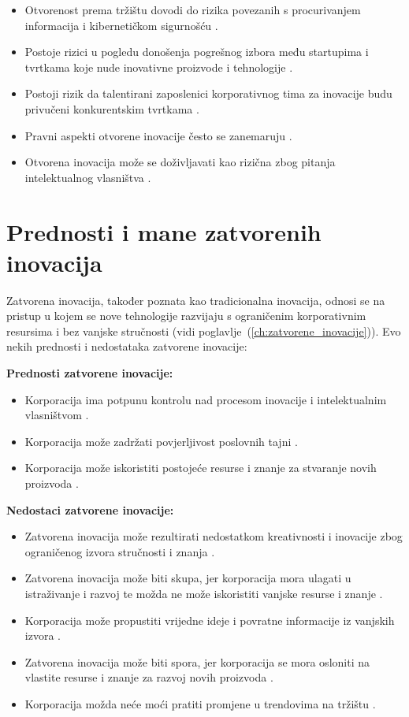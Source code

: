 \begin{itemize}
\item Otvorenost prema tržištu dovodi do rizika povezanih s procurivanjem
informacija i kibernetičkom sigurnošću \citep{gotechinnovationcompare2021}.
\item Postoje rizici u pogledu donošenja pogrešnog izbora među startupima i
tvrtkama koje nude inovativne proizvode i tehnologije \citep{gotechinnovationcompare2021}.
\item Postoji rizik da talentirani zaposlenici korporativnog tima za inovacije
budu privučeni konkurentskim tvrtkama \citep{gotechinnovationcompare2021}.
\item Pravni aspekti otvorene inovacije često se zanemaruju \citep{timercompare2016}.
\item Otvorena inovacija može se doživljavati kao rizična zbog pitanja
intelektualnog vlasništva \citep{a2dopeninnovation2023}.
\end{itemize}

\section{Prednosti i mane zatvorenih inovacija} \label{sec:prednosti_i_mane_zatvorenih_inovacija}

Zatvorena inovacija, također poznata kao tradicionalna inovacija, odnosi se na
pristup u kojem se nove tehnologije razvijaju s ograničenim korporativnim
resursima i bez vanjske stručnosti (vidi
poglavlje~(\ref{ch:zatvorene_inovacije})). Evo nekih prednosti i nedostataka
zatvorene inovacije:

\textbf{Prednosti zatvorene inovacije:}

\begin{itemize}
\item Korporacija ima potpunu kontrolu nad procesom inovacije i intelektualnim
vlasništvom \citep{asd1}.
\item Korporacija može zadržati povjerljivost poslovnih tajni \citep{asd1}.
\item Korporacija može iskoristiti postojeće resurse i znanje za stvaranje novih
proizvoda \citep{asd2}.
\end{itemize}

\textbf{Nedostaci zatvorene inovacije:}

\begin{itemize}
\item Zatvorena inovacija može rezultirati nedostatkom kreativnosti i inovacije
zbog ograničenog izvora stručnosti i znanja \citep{asd1}.
\item Zatvorena inovacija može biti skupa, jer korporacija mora ulagati u
istraživanje i razvoj te možda ne može iskoristiti vanjske resurse i znanje \citep{asd1}.
\item Korporacija može propustiti vrijedne ideje i povratne informacije iz
vanjskih izvora \citep{asd1}.
\item Zatvorena inovacija može biti spora, jer korporacija se mora osloniti na
vlastite resurse i znanje za razvoj novih proizvoda \citep{asd2}.
\item Korporacija možda neće moći pratiti promjene u trendovima na tržištu \citep{asd2}.
\end{itemize}

